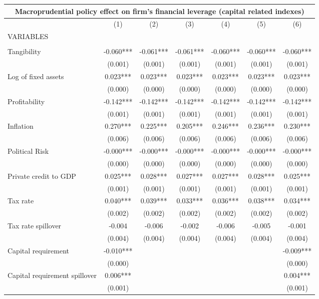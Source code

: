 \begin{tabular}{lcccccc}
\multicolumn{7}{c}{Macroprudential policy effect on firm's financial leverage (capital related indexes)} \\ \hline
 & (1) & (2) & (3) & (4) & (5) & (6) \\
VARIABLES &  &  &  &  &  &  \\ \hline
 &  &  &  &  &  &  \\
Tangibility & -0.060*** & -0.061*** & -0.061*** & -0.060*** & -0.060*** & -0.060*** \\
 & (0.001) & (0.001) & (0.001) & (0.001) & (0.001) & (0.001) \\
Log of fixed assets & 0.023*** & 0.023*** & 0.023*** & 0.023*** & 0.023*** & 0.023*** \\
 & (0.000) & (0.000) & (0.000) & (0.000) & (0.000) & (0.000) \\
Profitability & -0.142*** & -0.142*** & -0.142*** & -0.142*** & -0.142*** & -0.142*** \\
 & (0.001) & (0.001) & (0.001) & (0.001) & (0.001) & (0.001) \\
Inflation & 0.270*** & 0.225*** & 0.205*** & 0.246*** & 0.236*** & 0.230*** \\
 & (0.006) & (0.006) & (0.006) & (0.006) & (0.006) & (0.006) \\
Political Risk & -0.000*** & -0.000*** & -0.000*** & -0.000*** & -0.000*** & -0.000*** \\
 & (0.000) & (0.000) & (0.000) & (0.000) & (0.000) & (0.000) \\
Private credit to GDP & 0.025*** & 0.028*** & 0.027*** & 0.027*** & 0.028*** & 0.025*** \\
 & (0.001) & (0.001) & (0.001) & (0.001) & (0.001) & (0.001) \\
Tax rate & 0.040*** & 0.039*** & 0.033*** & 0.036*** & 0.038*** & 0.034*** \\
 & (0.002) & (0.002) & (0.002) & (0.002) & (0.002) & (0.002) \\
Tax rate spillover & -0.004 & -0.006 & -0.002 & -0.006 & -0.005 & -0.001 \\
 & (0.004) & (0.004) & (0.004) & (0.004) & (0.004) & (0.004) \\
Capital requirement & -0.010*** &  &  &  &  & -0.009*** \\
 & (0.000) &  &  &  &  & (0.000) \\
Capital requirement spillover & 0.006*** &  &  &  &  & 0.004*** \\
 & (0.001) &  &  &  &  & (0.001) \\

\end{tabular}

